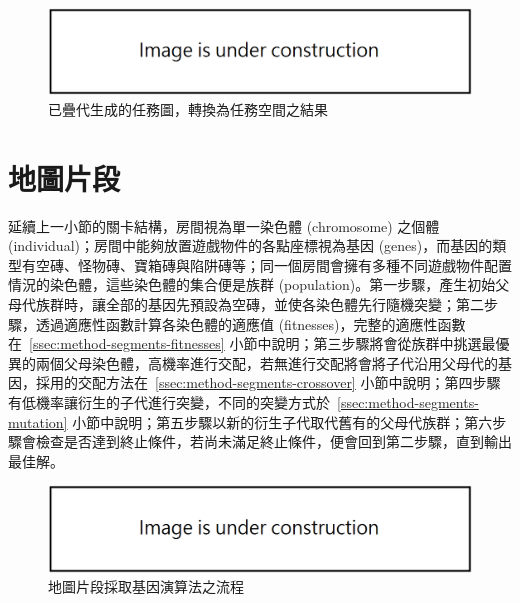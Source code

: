 \begin{figure}[ht]
  \begin{center}
    \includegraphics[width=1.0\textwidth]{figures/under_construction.png}
    \caption{已疊代生成的任務圖，轉換為任務空間之結果} 
    \label{fig:mission-to-space}
  \end{center}
\end{figure}

\section{地圖片段}
\label{sec:method-segments}

延續上一小節的關卡結構，房間視為單一染色體 (chromosome) 之個體 (individual)；房間中能夠放置遊戲物件的各點座標視為基因 (genes)，而基因的類型有空磚、怪物磚、寶箱磚與陷阱磚等；同一個房間會擁有多種不同遊戲物件配置情況的染色體，這些染色體的集合便是族群 (population)。第一步驟，產生初始父母代族群時，讓全部的基因先預設為空磚，並使各染色體先行隨機突變；第二步驟，透過適應性函數計算各染色體的適應值 (fitnesses)，完整的適應性函數在~\ref{ssec:method-segments-fitnesses} 小節中說明；第三步驟將會從族群中挑選最優異的兩個父母染色體，高機率進行交配，若無進行交配將會將子代沿用父母代的基因，採用的交配方法在~\ref{ssec:method-segments-crossover} 小節中說明；第四步驟有低機率讓衍生的子代進行突變，不同的突變方式於~\ref{ssec:method-segments-mutation} 小節中說明；第五步驟以新的衍生子代取代舊有的父母代族群；第六步驟會檢查是否達到終止條件，若尚未滿足終止條件，便會回到第二步驟，直到輸出最佳解。

\begin{figure}[ht]
  \begin{center}
    \includegraphics[width=1.0\textwidth]{figures/under_construction.png}
    \caption{地圖片段採取基因演算法之流程} 
    \label{fig:segments-with-ga}
  \end{center}
\end{figure}


